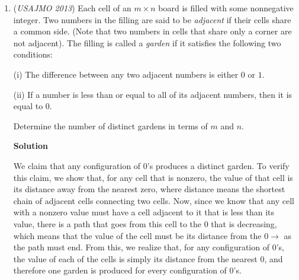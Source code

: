 \begin{enumerate}
 This means either $3|a$ or $3|b$, or both. WLOG, $3|a$. Looking at the original expression mod 9, we get $a^5b + 3 \equiv -1, 0$,or $1 \pmod 9$. Since $a$ is divisible by three, $a^5$ is divisible by 243, so it is divisible by 9. This reduces the equation to $3 \equiv -1, 0$,or $1 \pmod 9$, which obviously can't be true, a contradiction. Therefore, our original assumption, that both expressions were perfect cubes, is incorrect.

 So, no, no such integers exist.

 -sillybone

 \textbf{Note} After you get that $a^5 b \equiv 5, 6, \text{or} 7 \pmod{9}$, you can also bash by listing all possible residues for $a^5$ and their corresponding values for $b$. At that point, you can easily see that all the solutions for $a$ and $b$ do not work in the other equation, meaning that there are no solutions that satisfy both equations.

 


	\item (\textit{USAJMO 2013}) Each cell of an $m\times n$ board is filled with some nonnegative integer.  Two numbers in the filling are said to be \textit{adjacent} if their cells share a common side.  (Note that two numbers in cells that share only a corner are not adjacent).  The filling is called a \textit{garden} if it satisfies the following two conditions:


 (i) The difference between any two adjacent numbers is either $0$ or $1$.


 (ii) If a number is less than or equal to all of its adjacent numbers, then it is equal to $0$.


 Determine the number of distinct gardens in terms of $m$ and $n$.


 



\textbf{Solution}

We claim that any configuration of $0$'s produces a distinct garden.  To verify this claim, we show that, for any cell that is nonzero, the value of that cell is its distance away from the nearest zero, where distance means the shortest chain of adjacent cells connecting two cells.  Now, since we know that any cell with a nonzero value must have a cell adjacent to it that is less than its value, there is a path that goes from this cell to the $0$ that is decreasing, which means that the value of the cell must be its distance from the $0 \rightarrow$ as the path must end.  From this, we realize that, for any configuration of $0$'s, the value of each of the cells is simply its distance from the nearest $0$, and therefore one garden is produced for every configuration of $0$'s.  


\end{enumerate}
